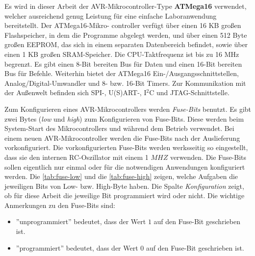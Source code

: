 Es wird in dieser Arbeit der AVR-Mikrocontroller-Type \textbf{ATMega16} verwendet, welcher ausreichend genug Leistung für eine einfache Laboranwendung bereitstellt. Der ATMega16-Mikro- controller verfügt über einen 16 KB großen Flashspeicher, in dem die Programme abgelegt werden, und über einen 512 Byte großen EEPROM, das sich in einem separaten Datenbereich befindet, sowie über einen 1 KB großen SRAM-Speicher. Die CPU-Taktfrequenz ist bis zu 16 MHz begrenzt. Es gibt einen 8-Bit bereiten Bus für Daten und einen 16-Bit bereiten Bus für Befehle. Weiterhin bietet der ATMega16 Ein-/Ausgangsschnittstellen, Analog/Digital-Umwandler und 8- bzw. 16-Bit Timers. Zur Kommunikation mit der Außenwelt befinden sich SPI-, U(S)ART-, I$^2$C und JTAG-Schnittstelle. \smallskip \smallskip

Zum Konfigurieren eines AVR-Mikrocontrollers werden \textit{Fuse-Bits} benutzt. Es gibt zwei Bytes (\textit{low} und \textit{high}) zum Konfigurieren von Fuse-Bits. Diese werden beim System-Start des Mikrocontrollers und während dem Betrieb verwendet. Bei einem neuen AVR-Mikrocontroller werden die Fuse-Bits nach der Auslieferung vorkonfiguriert. Die vorkonfigurierten Fuse-Bits werden werksseitig so eingestellt, dass sie den internen RC-Oszillator mit einem 1 $MHZ$ verwenden. Die Fuse-Bits sollen eigentlich nur einmal oder für die notwendigen Anwendungen konfiguriert werden. Die \autoref{tab:fuse-low} und die \autoref{tab:fuse-high} zeigen, welche Aufgaben die jeweiligen Bits von Low- bzw. High-Byte haben. Die Spalte \textit{Konfiguration} zeigt, ob für diese Arbeit die jeweilige Bit programmiert wird oder nicht. Die wichtige Anmerkungen zu den Fuse-Bits sind: 

\begin{itemize}
	\item ''unprogrammiert'' bedeutet, dass der Wert $1$ auf den Fuse-Bit geschrieben ist.
	\item ''programmiert''  bedeutet, dass der Wert $0$ auf den Fuse-Bit geschrieben ist.
\end{itemize}

